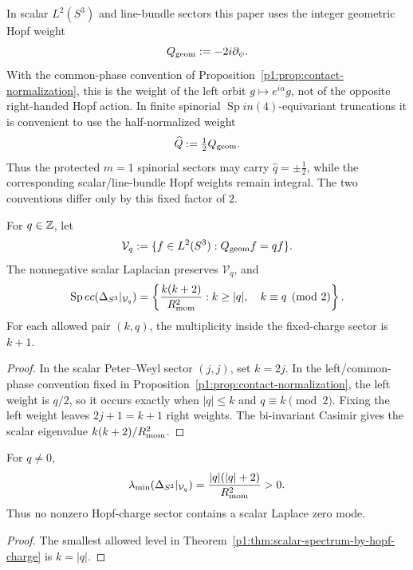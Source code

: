 \documentclass[11pt]{article}
\begin{document}
\begin{remark}
In scalar \(L^2(S^3)\) and line-bundle sectors this paper uses the integer geometric Hopf weight
\[
Q_{\rm geom}:=-2i\partial_\psi.
\]
With the common-phase convention of
Proposition~\ref{p1:prop:contact-normalization}, this is the weight of the
left orbit \(g\mapsto e^{i\alpha}g\), not of the opposite right-handed Hopf
action.
In finite spinorial \(\operatorname{Sp}in(4)\)-equivariant truncations it is convenient to use the half-normalized weight
\[
\widehat Q:=\tfrac12 Q_{\rm geom}.
\]
Thus the protected \(m=1\) spinorial sectors may carry \(\widehat q=\pm\tfrac12\), while the corresponding scalar/line-bundle Hopf weights remain integral. The two conventions differ only by this fixed factor of \(2\).
\end{remark}

\begin{theorem}
\label{p1:thm:scalar-spectrum-by-hopf-charge}
For \(q\in\mathbb{Z}\), let
\[
  \mathcal V_q:=\{f\in L^2(S^3):Q_{\rm geom}f=qf\}.
\]
The nonnegative scalar Laplacian preserves \(\mathcal V_q\), and
\[
  \operatorname{Sp}ec(\Delta_{S^3}|_{\mathcal V_q})
  =\left\{\frac{k(k+2)}{R_{\mathrm{mom}}^2}:
  k\ge|q|,\quad k\equiv q\pmod2\right\}.
\]
For each allowed pair \((k,q)\), the multiplicity inside the fixed-charge
sector is \(k+1\).
\end{theorem}

\begin{proof}
In the scalar Peter--Weyl sector \((j,j)\), set \(k=2j\).  In the
left/common-phase convention fixed in
Proposition~\ref{p1:prop:contact-normalization}, the left weight is
\(q/2\), so it occurs exactly when \(|q|\le k\) and
\(q\equiv k\pmod2\).  Fixing the left weight leaves
\(2j+1=k+1\) right weights.  The bi-invariant
Casimir gives the scalar eigenvalue \(k(k+2)/R_{\mathrm{mom}}^2\).
\end{proof}

\begin{corollary}
\label{p1:cor:hopf-charge-gap}
For \(q\ne0\),
\[
  \lambda_{\min}(\Delta_{S^3}|_{\mathcal V_q})
  =\frac{|q|(|q|+2)}{R_{\mathrm{mom}}^2}>0.
\]
Thus no nonzero Hopf-charge sector contains a scalar Laplace zero mode.
\end{corollary}

\begin{proof}
The smallest allowed level in Theorem~\ref{p1:thm:scalar-spectrum-by-hopf-charge}
is \(k=|q|\).
\end{proof}
\end{document}
